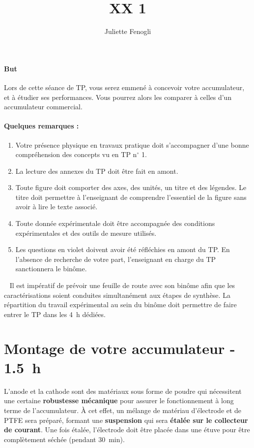 \documentclass[twoside,a4paper,11pt,addpoints]{exam}%
\title{XX 1}
\date{}
\author{Juliette Fenogli}
\begin{document}
%


\paragraph*{But} 
Lors de cette séance de TP, vous serez emmené à concevoir votre accumulateur, et à étudier ses performances. Vous pourrez alors les comparer à celles d'un accumulateur commercial.

\paragraph*{Quelques remarques :}

\begin{enumerate}
\item Votre présence physique en travaux pratique doit s'accompagner d'une bonne compréhension des concepts vu en TP n$^\circ$ 1.
\item La lecture des annexes du TP doit être fait en amont.
\item Toute figure doit comporter des axes, des unités, un titre et des légendes. Le titre doit permettre à l'enseignant de comprendre l'essentiel de la figure sans avoir à lire le texte associé.
\item Toute donnée expérimentale doit être accompagnée des conditions expérimentales et des outils de mesure utilisés.
\item Les questions en {\color{purple} violet} doivent avoir été réfléchies en amont du TP. En l'absence de recherche de votre part, l'enseignant en charge du TP sanctionnera le binôme.
\end{enumerate}

\faWarning ~ Il est impératif de prévoir une feuille de route avec son binôme afin que les caractérisations soient conduites simultanément aux étapes de synthèse. La répartition du travail expérimental au sein du binôme doit permettre de faire entrer le TP dans les \SI{4}{\hour} dédiées.

\tableofcontents

\section{Montage de votre accumulateur - \faClockO ~ \SI{1.5}{\hour}}

L'anode et la cathode sont des matériaux sous forme de poudre qui nécessitent une certaine \textbf{robustesse mécanique} pour assurer le fonctionnement à long terme de l'accumulateur. À cet effet, un mélange de matériau d'électrode et de PTFE sera préparé, formant une \textbf{suspension} qui sera \textbf{étalée sur le collecteur de courant}. Une fois étalée, l'électrode doit être placée dans une étuve pour être complètement séchée (pendant \SI{30}{\minute}). 
\end{document}
